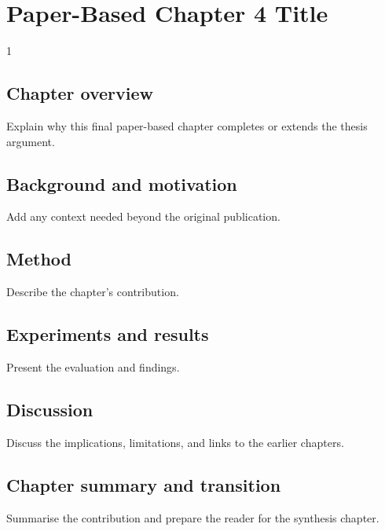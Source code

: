 \doublespacing %

\chapter{Paper-Based Chapter 4 Title}
\label{ch:paper4}

\begin{spacing}{1} %
\minitoc %
\end{spacing} %
\thesisspacing %


\section{Chapter overview}

Explain why this final paper-based chapter completes or extends the thesis argument.

\section{Background and motivation}

Add any context needed beyond the original publication.

\section{Method}

Describe the chapter's contribution.

\section{Experiments and results}

Present the evaluation and findings.

\section{Discussion}

Discuss the implications, limitations, and links to the earlier chapters.

\section{Chapter summary and transition}

Summarise the contribution and prepare the reader for the synthesis chapter.
